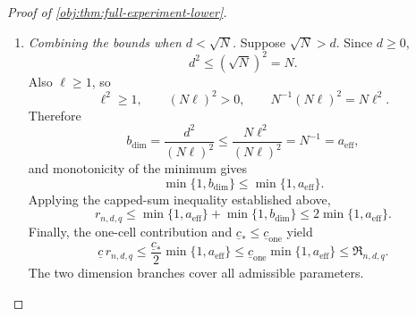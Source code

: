 \documentclass[11pt]{article}
\begin{document}
\begin{proof}[Proof of \cref{obj:thm:full-experiment-lower}]
\begin{enumerate}
For the nonnegative quantities \(a_{\mathrm{eff}},b_{\mathrm{dim}}\),
\[
\min\{1,a_{\mathrm{eff}}+b_{\mathrm{dim}}\}
\le
\min\{1,a_{\mathrm{eff}}\}+\min\{1,b_{\mathrm{dim}}\}.
\]
Indeed, if both quantities are at most one, the right-hand side is their sum;
if either is at least one, the right-hand side is at least one.
Each capped quantity is at most their maximum, so
\[
\min\{1,a_{\mathrm{eff}}+b_{\mathrm{dim}}\}
\le
2\max\{\min\{1,a_{\mathrm{eff}}\},\min\{1,b_{\mathrm{dim}}\}\},
\]
while the component risk bounds imply
\[
\underline c_*
\max\{\min\{1,a_{\mathrm{eff}}\},\min\{1,b_{\mathrm{dim}}\}\}
\le\mathfrak R_{n,d,q}.
\]
Since \(\mathfrak R_{n,d,q}\ge0\), we conclude that
\[
\underline c\,r_{n,d,q}
\le
\frac{\underline c_*}{2}
\max\{\min\{1,a_{\mathrm{eff}}\},\min\{1,b_{\mathrm{dim}}\}\}
\le\frac12\mathfrak R_{n,d,q}
\le\mathfrak R_{n,d,q}.
\]

\item \emph{Combining the bounds when \(d<\sqrt N\).}
Suppose \(\sqrt N>d\). Since \(d\ge0\),
\[
d^2\le(\sqrt N)^2=N.
\]
Also \(\ell\ge1\), so
\[
\ell^2\ge1,\qquad
(N\ell)^2>0,\qquad
N^{-1}(N\ell)^2=N\ell^2.
\]
Therefore
\[
b_{\mathrm{dim}}
=\frac{d^2}{(N\ell)^2}
\le\frac{N\ell^2}{(N\ell)^2}
=N^{-1}
=a_{\mathrm{eff}},
\]
and monotonicity of the minimum gives
\[
\min\{1,b_{\mathrm{dim}}\}
\le\min\{1,a_{\mathrm{eff}}\}.
\]
Applying the capped-sum inequality established above,
\[
r_{n,d,q}
\le
\min\{1,a_{\mathrm{eff}}\}+\min\{1,b_{\mathrm{dim}}\}
\le2\min\{1,a_{\mathrm{eff}}\}.
\]
Finally, the one-cell contribution and
\(\underline c_*\le\underline c_{\mathrm{one}}\) yield
\[
\underline c\,r_{n,d,q}
\le
\frac{\underline c_*}{2}\min\{1,a_{\mathrm{eff}}\}
\le
\underline c_{\mathrm{one}}\min\{1,a_{\mathrm{eff}}\}
\le\mathfrak R_{n,d,q}.
\]
The two dimension branches cover all admissible parameters.
\end{enumerate}
\end{proof}




\end{document}
